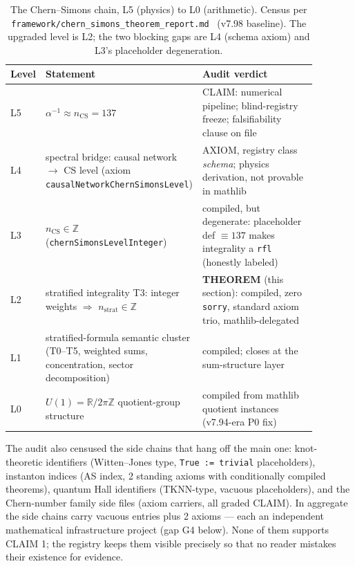 \begin{table}[t]
\begin{center}
\small
\begin{tabular}{@{}p{0.065\linewidth}p{0.40\linewidth}p{0.42\linewidth}@{}}
\toprule
Level & Statement & Audit verdict \\
\midrule
L5 & $\alpha^{-1} \approx n_{\mathrm{CS}} = 137$ & CLAIM: numerical
pipeline; blind-registry freeze; falsifiability clause on file \\
L4 & spectral bridge: causal network
$\to$ CS level (axiom \texttt{causalNetworkChernSimonsLevel}) &
AXIOM, registry class \emph{schema}; physics derivation, not
provable in mathlib \\
L3 & $n_{\mathrm{CS}} \in \mathbb{Z}$
(\texttt{chernSimonsLevelInteger}) & compiled, but degenerate:
placeholder def $\equiv 137$ makes integrality a
\texttt{rfl} (honestly labeled) \\
L2 & stratified integrality T3: integer weights $\Rightarrow$
$n_{\mathrm{strat}} \in \mathbb{Z}$ & \textbf{THEOREM} (this
section): compiled, zero \texttt{sorry}, standard axiom trio,
mathlib-delegated \\
L1 & stratified-formula semantic cluster (T0--T5, weighted sums,
concentration, sector decomposition) & compiled; closes at the
sum-structure layer \\
L0 & $U(1) = \mathbb{R}/2\pi\mathbb{Z}$ quotient-group structure &
compiled from mathlib quotient instances (v7.94-era P0 fix) \\
\bottomrule
\end{tabular}
\caption{The Chern--Simons chain, L5 (physics) to L0 (arithmetic).
Census per \texttt{framework/chern\_simons\_theorem\_report.md}~\cite{sylvacsreport2026}
(v7.98 baseline). The upgraded level is L2; the two blocking gaps
are L4 (schema axiom) and L3's placeholder degeneration.}
\label{tab:chain}
\end{center}
\end{table}

The audit also censused the side chains that hang off the main
one: knot-theoretic identifiers (Witten--Jones type, 
\texttt{True := trivial} placeholders), instanton indices (AS
index, 2 standing axioms with conditionally compiled theorems),
quantum Hall identifiers (TKNN-type,  vacuous
placeholders), and the Chern-number family side files (axiom
carriers, all graded CLAIM). In aggregate the side chains carry
 vacuous entries plus 2 axioms --- each an independent
mathematical infrastructure project (gap G4 below). None of them
supports CLAIM 1; the registry keeps them visible precisely so
that no reader mistakes their existence for evidence.

